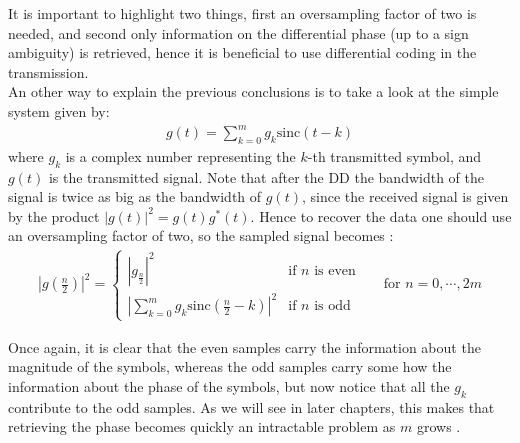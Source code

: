 It is important to highlight two things, first an oversampling factor of two is needed, and second only information on the differential phase (up to a sign ambiguity) is retrieved, hence it is beneficial to use differential coding in the transmission.\\

An other way to explain the previous conclusions is to take a look at the simple system given by:
\begin{align*}
	g(t)=\sum_{k=0}^m g_k\text{sinc}(t-k)
\end{align*}
where $g_k$ is a complex number representing the $k$-th transmitted symbol, and $g(t)$ is the transmitted signal. Note that after the DD the bandwidth of the signal is twice as big as the bandwidth of $g(t)$, since the received signal is given by the product $|g(t)|^2=g(t)g^*(t)$. Hence to recover the data one should use an oversampling factor of two, so the sampled signal becomes \cite{Tasbihi_Tukey}:
\begin{align*}
	\left|g\left(\frac{n}{2}\right)\right|^2 = \left\{
\begin{array}{ll}
\left|g_{\frac{n}{2}}\right|^2  &  \text{if $n$ is even}  \\
\left|\sum\limits_{k=0}^m g_k\text{sinc}\left(\frac{n}{2}-k\right)\right|^2   & \text{if $n$ is odd}
\end{array}
\right. &&\text{for }n=0,\dotsb,2m
\end{align*}


Once again, it is clear that the even samples carry the information about the magnitude of the symbols, whereas the odd samples carry some how the information about the phase of the symbols, but now notice that all the $g_k$ contribute to the odd samples. As we will see in later chapters, this makes that retrieving the phase becomes quickly an intractable problem as $m$ grows \cite{Tasbihi_Tukey}. 

















